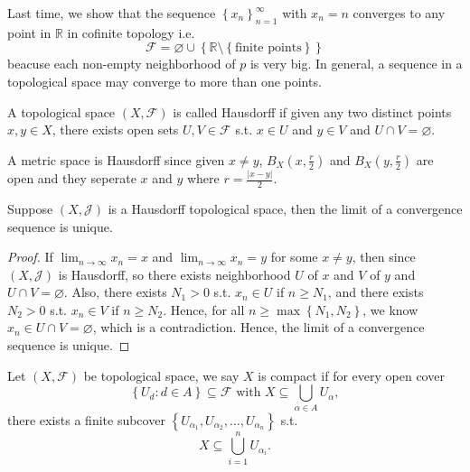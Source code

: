 Last time, we show that the sequence \(\left\{ x_n \right\}_{n=1}^{\infty}  \) with \(x_n = n\) converges to any point in \(\mathbb{R} \) in cofinite topology i.e. 
\[
    \mathcal{F} = \varnothing \cup \left\{ \mathbb{R} \setminus \left\{ \text{finite points} \right\}  \right\}
\] beacuse each non-empty neighborhood of \(p\) is very big.  
In general, a sequence in a topological space may converge to more than one points. 
\begin{definition}[Hausdorff] \label{def: Hausdorff}
    A topological space \((X, \mathcal{F} )\)  is called Hausdorff if given any two distinct points \(x, y \in X\), there exists open sets \(U, V \in \mathcal{F} \) s.t. \(x \in U\) and \(y \in V\) and \(U \cap V = \varnothing \).     
\end{definition}

\begin{eg}
    A metric space is Hausdorff since given \(x \neq y\), \(B_X \left( x, \frac{r}{2} \right) \) and \(B_X \left( y, \frac{r}{2} \right) \) are open and they seperate \(x\) and \(y\) where \(r = \frac{\vert x - y \vert }{2}\).     
\end{eg}

\begin{theorem} \label{thm: Hausdorff implies converge to exactly one point}
    Suppose \((X, \mathcal{J} )\) is a Hausdorff topological space, then the limit of a convergence sequence is unique.  
\end{theorem}
\begin{proof}
    If \(\lim_{n \to \infty} x_n = x\) and \(\lim_{n \to \infty} x_n = y \) for some \(x \neq y\), then since \((X, \mathcal{J} )\) is Hausdorff, so there exists neighborhood \(U\) of \(x\) and \(V\) of \(y\) and \(U \cap V = \varnothing \). Also, there exists \(N_1 > 0\) s.t. \(x_n \in U\) if \(n \ge N_1\), and there exists \(N_2 > 0\) s.t. \(x_n \in V\) if \(n \ge N_2\). Hence, for all \(n \ge \max \left\{ N_1, N_2 \right\} \), we know \(x_n \in U \cap V = \varnothing \), which is a contradiction. Hence, the limit of a convergence sequence is unique.                 
\end{proof}

\begin{definition}[Compact] \label{def: compact in topological space}
    Let \((X, \mathcal{F} )\) be topological space, we say \(X\) is compact if for every open cover 
    \[
        \left\{ U_d : d \in A \right\} \subseteq \mathcal{F} \text{ with } X \subseteq \bigcup_{\alpha \in A} U_\alpha,  
    \] there exists a finite subcover \(\left\{ U_{\alpha _1}, U_{\alpha _2}, \dots , U_{\alpha _n} \right\} \) s.t. 
    \[
        X \subseteq \bigcup_{i=1}^n U_{\alpha _i}.  
    \] 
\end{definition}


